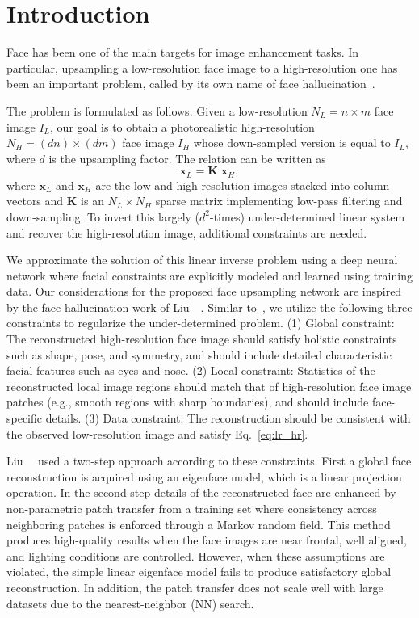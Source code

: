\documentclass[runningheads]{llncs}
\begin{document}
\section{Introduction} \label{sec:intro}



Face has been one of the main targets for image enhancement tasks. In particular, upsampling a low-resolution face image to a high-resolution one has been an important problem, called by its own name of face hallucination~\cite{Baker00FG}.

The problem is formulated as follows. Given a low-resolution $N_L = n \times m$ face image $I_L$, our goal is to obtain a photorealistic high-resolution $N_H = (d  n) \times (d  m)$ face image $I_H$ whose down-sampled version is equal to $I_L$, where $d$ is the upsampling factor. The relation can be written as
\begin{equation}\label{eq:lr_hr}
 \mathbf{x}_L = \mathbf{K} \; \mathbf{x}_H ,
\end{equation}
where $\mathbf{x}_L$ and $\mathbf{x}_H$ are the low and high-resolution images stacked into column vectors and $\mathbf{K}$ is an $N_L \times N_H$ sparse matrix implementing low-pass filtering and down-sampling. To invert this largely ($d^2$-times) under-determined linear system and recover the high-resolution image, additional constraints are needed.

We approximate the solution of this linear inverse problem using a deep neural network where facial constraints are explicitly modeled and learned using training data.
%
Our considerations for the proposed face upsampling network are inspired by the face hallucination work of Liu~\etal~\cite{Liu07}. Similar to~\cite{Liu07}, we utilize the following three constraints to regularize the under-determined problem. (1) Global constraint: The reconstructed high-resolution face image should satisfy holistic constraints such as shape, pose, and symmetry, and should include detailed characteristic facial features such as eyes and nose. (2) Local constraint: Statistics of the reconstructed local image regions should match that of high-resolution face image patches (e.g., smooth regions with sharp boundaries), and should include face-specific details. (3) Data constraint: The reconstruction should be consistent with the observed low-resolution image and satisfy Eq.~\eqref{eq:lr_hr}.

Liu~\etal~\cite{Liu07} used a two-step approach according to these constraints. First a global face reconstruction is acquired using an eigenface model, which is a linear projection operation. In the second step details of the reconstructed face are enhanced by non-parametric patch transfer from a training set where consistency across neighboring patches is enforced through a Markov random field. This method produces high-quality results when the face images are near frontal, well aligned, and lighting conditions are controlled. However, when these assumptions are violated, the simple linear eigenface model fails to produce satisfactory global reconstruction. In addition, the patch transfer does not scale well with large datasets due to the nearest-neighbor (NN) search.
\end{document}
